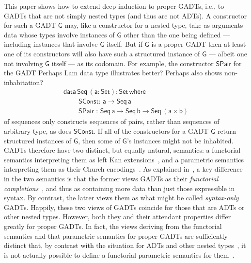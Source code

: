 \documentclass[9pt]{entcs}
\begin{document}
This paper shows how to extend deep induction to proper GADTs, i.e.,
to GADTs that are not simply nested types (and thus are not ADTs).  A
constructor for such a GADT $\mathsf{G}$ may, like a constructor for a
nested type, take as arguments data whose types involve instances of
$\mathsf{G}$ other than the one being defined --- including instances
that involve $\mathsf{G}$ itself. But if $\mathsf{G}$ is a proper GADT
then at least one of its constructors will also have such a structured
instance of $\mathsf{G}$ --- albeit one not involving $\mathsf{G}$
itself --- as its codomain.
For example, the constructor $\mathsf{SPair}$ for the GADT
{\color{red} Perhaps Lam data type illustrates better? Perhaps also
  shows non-inbabitation?}
\begin{equation}\label{eq:eq-seq}
\begin{array}{l}
\mathsf{data\, Seq\,(a : Set) : Set\,where}\\
\mathsf{\;\;\;\;\;\;\;\;SConst :\, a \to Seq\,a}\\
\mathsf{\;\;\;\;\;\;\;\;SPair\,\, :\, Seq \,a \to Seq\,b \to
  Seq\,(a \times b)}
\end{array}
\end{equation}
\noindent
of sequences only constructs sequences of pairs, rather than sequences
of arbitrary type, as does $\mathsf{SConst}$. If all of the
constructors for a GADT $\mathsf{G}$ return structured instances of
$\mathsf{G}$, then some of $\mathsf{G}$'s instances might not be
inhabited. GADTs therefore have two distinct, but equally natural,
semantics: a functorial semantics interpreting them as left Kan
extensions~\cite{mac71}, and a parametric semantics interpreting them
as their Church encodings~\cite{}. As explained in~\cite{jgj21}, a key
difference in the two semantics is that the former views GADTs as
their {\em functorial completions}~\cite{jp19}, and thus as containing
more data than just those expressible in syntax. By contrast, the
latter views them as what might be called {\em syntax-only}
GADTs. Happily, these two views of GADTs coincide for those that are
ADTs or other nested types. However, both they and their attendant
properties differ greatly for proper GADTs. In fact, the views
deriving from the functorial semantics and that parametric semantics
for proper GADTs are sufficiently distinct that, by contrast with the
situation for ADTs and other nested
types~\cite{bfss90,gjfor15,jgj21f}, it is not actually possible
to define a functorial parametric semantics for them~\cite{jgj21}.
\end{document}
